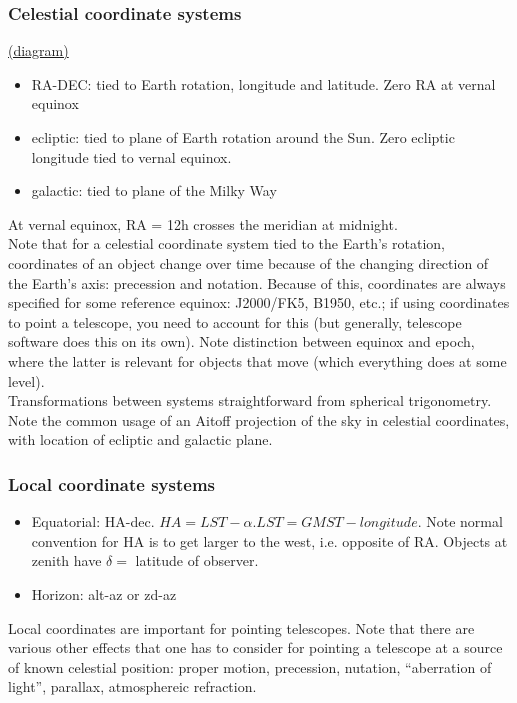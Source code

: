 \documentclass[12pt]{article}
\begin{document}
\subsubsection*{Celestial coordinate systems}
\textcolor{blue}
{\href{http://csep10.phys.utk.edu/astr161/lect/time/coordinates.html}{(diagram)}}
\begin{itemize}
    \item RA-DEC: tied to Earth rotation, longitude and latitude.
        Zero RA at vernal equinox
    \item ecliptic: tied to plane of Earth rotation around the Sun.
        Zero ecliptic longitude tied to vernal equinox.
    \item galactic: tied to plane of the Milky Way
\end{itemize}

\noindent At vernal equinox, RA = 12h crosses the meridian at midnight.\\

\noindent Note that for a celestial coordinate system tied to the Earth's rotation,
coordinates of an object change over time because of the changing direction
of the Earth's axis: precession and notation. Because of this, coordinates are
always specified for some reference equinox: J2000/FK5, B1950, etc.; if using
coordinates to point a telescope, you need to account for this (but generally,
telescope software does this on its own). Note distinction between equinox and
epoch, where the latter is relevant for objects that move (which everything does
at some level).\\

\noindent Transformations between systems straightforward from spherical
trigonometry.\\

\noindent Note the common usage of an Aitoff projection of the sky in celestial
coordinates, with location of ecliptic and galactic plane.

\subsubsection*{Local coordinate systems}
\begin{itemize}
    \item Equatorial: HA-dec. $HA=LST - \alpha. LST=GMST - longitude$.
        Note normal convention for HA is to get larger to the west, i.e.
        opposite of RA. Objects at zenith have $\delta=$ latitude of observer.
    \item Horizon: alt-az or zd-az
\end{itemize}
Local coordinates are important for pointing telescopes. Note that there are
various other effects that one has to consider for pointing a telescope at a
source of known celestial position: proper motion, precession, nutation,
``aberration of light'', parallax, atmosphereic refraction.
\end{document}
